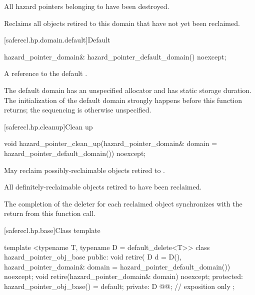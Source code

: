 \begin{itemdescr}

\expects
All hazard pointers belonging to  have been destroyed.

\effects
Reclaims all objects retired to this domain that have not yet been reclaimed.

\end{itemdescr}

[saferecl.hp.domain.default]{Default }

\begin{itemdecl}
hazard_pointer_domain& hazard_pointer_default_domain() noexcept;
\end{itemdecl}

\begin{itemdescr}

\returns 
A reference to the default .

\remarks 
The default domain has an unspecified allocator and has static storage
duration. The initialization of the default domain strongly happens before this function
returns; the sequencing is otherwise unspecified.

\end{itemdescr}

[saferecl.hp.cleanup]{Clean up}

\begin{itemdecl}
void hazard_pointer_clean_up(hazard_pointer_domain& domain = hazard_pointer_default_domain())
  noexcept;
\end{itemdecl}

\begin{itemdescr}

\effects 
May reclaim possibly-reclaimable objects retired to .

\ensures 
All definitely-reclaimable objects retired to  have been reclaimed.

\sync 
The completion of the deleter for each reclaimed object synchronizes with the return from this function call.

\end{itemdescr}

[saferecl.hp.base]{Class template }

\begin{codeblock}
template <typename T, typename D = default_delete<T>>
class hazard_pointer_obj_base {
public:
  void retire(
    D d = D(),
    hazard_pointer_domain& domain = hazard_pointer_default_domain()) noexcept;
  void retire(hazard_pointer_domain& domain) noexcept;
protected:
  hazard_pointer_obj_base() = default;
private:
  D @@; // exposition only
};
\end{codeblock}

